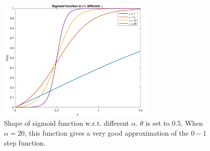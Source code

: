 \begin{figure}
	\centering
	\includegraphics[height=60mm]{../figs/sigmoid_small.pdf}
	\caption{Shape of sigmoid function w.r.t. different $\alpha$. $\theta$ is set to $0.5$. When $\alpha=20$, this function gives a very good approximation of the $0-1$ step function.}
	\label{fig:sigmoid_alpha}
\end{figure}

